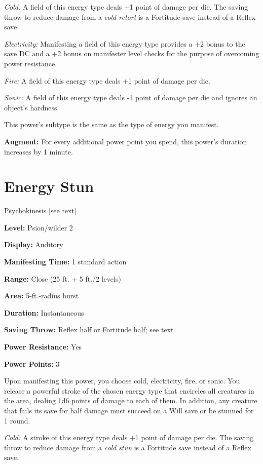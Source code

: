 \documentclass{article}
\begin{document}
\textit{Cold: }A field of this energy type deals +1 point of damage per die. The 
saving throw to reduce damage from a \textit{cold retort }is a Fortitude save instead 
of a Reflex save.

\textit{Electricity: }Manifesting a field of this energy type provides a +2 bonus 
to the save DC and a +2 bonus on manifester level checks for the purpose of overcoming 
power resistance.

\textit{Fire: }A field of this energy type deals +1 point of damage per die.

\textit{Sonic: }A field of this energy type deals -1 point of damage per die and 
ignores an object's hardness. 

This power's subtype is the same as the type of energy you manifest.

\textbf{Augment:} For every additional power point you spend, this power's duration 
increases by 1 minute.

\vspace{12pt}
\section*{Energy Stun}

Psychokinesis [see text]

\textbf{Level:} Psion/wilder 2

\textbf{Display:} Auditory

\textbf{Manifesting Time:} 1 standard action

\textbf{Range:} Close (25 ft. + 5 ft./2 levels)

\textbf{Area:} 5-ft.-radius burst

\textbf{Duration:} Instantaneous

\textbf{Saving Throw:} Reflex half or Fortitude half; see text

\textbf{Power Resistance:} Yes

\textbf{Power Points:} 3

Upon manifesting this power, you choose cold, electricity, fire, or sonic. You 
release a powerful stroke of the chosen energy type that encircles all creatures 
in the area, dealing 1d6 points of damage to each of them. In addition, any creature 
that fails its save for half damage must succeed on a Will save or be stunned for 
1 round.

\textit{Cold: }A stroke of this energy type deals +1 point of damage per die. The 
saving throw to reduce damage from a \textit{cold stun }is a Fortitude save instead 
of a Reflex save.
\end{document}
